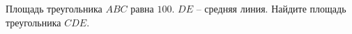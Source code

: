 \begin{ex}
	\begin{condition}
		Площадь треугольника \( ABC  \) равна \( 100 \). \( DE \) – средняя линия. Найдите площадь треугольника \( CDE \).
	\end{condition}
\end{ex}